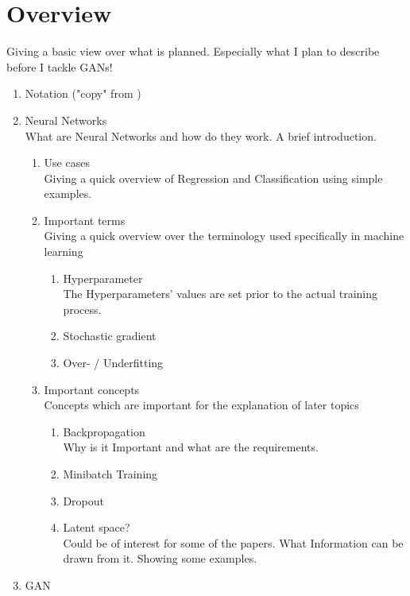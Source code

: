\section{Overview}

Giving a basic view over what is planned. Especially what I plan to describe before I tackle GANs!

\begin{enumerate}
  \item Notation ("copy" from \cite{2})

  \item Neural Networks \\
    What are Neural Networks and how do they work. A brief introduction.

  \begin{enumerate}

    \item Use cases \\
      Giving a quick overview of Regression and Classification using simple examples.

    \item Important terms \\
      Giving a quick overview over the terminology used specifically in machine learning

      \begin{enumerate}

        \item Hyperparameter \\
          The Hyperparameters' values are set prior to the actual training process.

        \item Stochastic gradient

        \item Over- / Underfitting

      \end{enumerate}

    \item Important concepts \\
      Concepts which are important for the explanation of later topics

    \begin{enumerate}

      \item Backpropagation \\
        Why is it Important and what are the requirements.

      \item Minibatch Training

      \item Dropout

      \item Latent space? \\
        Could be of interest for some of the papers.
        What Information can be drawn from it. Showing some examples.

    \end{enumerate}

  \end{enumerate}

  \item GAN
\end{enumerate}
